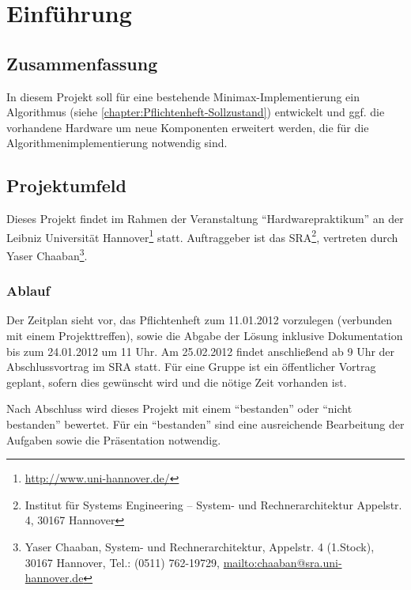 \chapter{Einführung}
\label{chapter:Pflichtenheft-Einfuehrung}

\section{Zusammenfassung}
\label{section:Pflichtenheft-Einfuehrung-Zusammenfassung}

In diesem Projekt soll für eine bestehende Minimax-Implementierung ein Algorithmus (siehe \autoref{chapter:Pflichtenheft-Sollzustand}) entwickelt und ggf. die vorhandene Hardware um neue Komponenten erweitert werden, die für die Algorithmenimplementierung notwendig sind.

\section{Projektumfeld}
\label{section:Pflichtenheft-Einfuehrung-Projektumfeld}

Dieses Projekt findet im Rahmen der Veranstaltung "`Hardwarepraktikum"' an der Leibniz Universität Hannover\footnote{\url{http://www.uni-hannover.de/}} statt. Auftraggeber ist das SRA\footnote{Institut für Systems Engineering -- System- und Rechnerarchitektur Appelstr. 4, 30167 Hannover}, vertreten durch Yaser Chaaban\footnote{Yaser Chaaban, System- und Rechnerarchitektur, Appelstr. 4 (1.Stock), 30167 Hannover, Tel.: (0511) 762-19729, \url{mailto:chaaban@sra.uni-hannover.de}}.

\subsection{Ablauf}
\label{subsection:Pflichtenheft-Einfuehrung-Projektumfeld-Ablauf}

Der Zeitplan sieht vor, das Pflichtenheft zum 11.01.2012 vorzulegen (verbunden mit einem Projekttreffen), sowie die Abgabe der Lösung inklusive Dokumentation bis zum 24.01.2012 um 11 Uhr. Am 25.02.2012 findet anschließend ab 9 Uhr der Abschlussvortrag im SRA statt. Für eine Gruppe ist ein öffentlicher Vortrag geplant, sofern dies gewünscht wird und die nötige Zeit vorhanden ist.

Nach Abschluss wird dieses Projekt mit einem "`bestanden"' oder "`nicht bestanden"' bewertet. Für ein "`bestanden"' sind eine ausreichende Bearbeitung der Aufgaben sowie die Präsentation notwendig.

